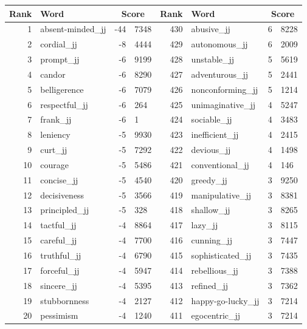 \begin{table}[tbp]
    \begin{tabular}{| rlr@{.}l | rlr@{.}l |}
    \hline
    \textbf{Rank} & \textbf{Word} & \multicolumn{2}{c|}{\textbf{Score}} & \textbf{Rank} & \textbf{Word} & \multicolumn{2}{c|}{\textbf{Score}} \\
    \hline
    1 & absent-minded\_jj & -44 & 7348    &    430 & abusive\_jj & 6 & 8228 \\
    2 & cordial\_jj & -8 & 4444    &    429 & autonomous\_jj & 6 & 2009 \\
    3 & prompt\_jj & -6 & 9199    &    428 & unstable\_jj & 5 & 5619 \\
    4 & candor & -6 & 8290    &    427 & adventurous\_jj & 5 & 2441 \\
    5 & belligerence & -6 & 7079    &    426 & nonconforming\_jj & 5 & 1214 \\
    6 & respectful\_jj & -6 & 264    &    425 & unimaginative\_jj & 4 & 5247 \\
    7 & frank\_jj & -6 & 1    &    424 & sociable\_jj & 4 & 3483 \\
    8 & leniency & -5 & 9930    &    423 & inefficient\_jj & 4 & 2415 \\
    9 & curt\_jj & -5 & 7292    &    422 & devious\_jj & 4 & 1498 \\
    10 & courage & -5 & 5486    &    421 & conventional\_jj & 4 & 146 \\
    11 & concise\_jj & -5 & 4540    &    420 & greedy\_jj & 3 & 9250 \\
    12 & decisiveness & -5 & 3566    &    419 & manipulative\_jj & 3 & 8381 \\
    13 & principled\_jj & -5 & 328    &    418 & shallow\_jj & 3 & 8265 \\
    14 & tactful\_jj & -4 & 8864    &    417 & lazy\_jj & 3 & 8115 \\
    15 & careful\_jj & -4 & 7700    &    416 & cunning\_jj & 3 & 7447 \\
    16 & truthful\_jj & -4 & 6790    &    415 & sophisticated\_jj & 3 & 7435 \\
    17 & forceful\_jj & -4 & 5947    &    414 & rebellious\_jj & 3 & 7388 \\
    18 & sincere\_jj & -4 & 5395    &    413 & refined\_jj & 3 & 7362 \\
    19 & stubbornness & -4 & 2127    &    412 & happy-go-lucky\_jj & 3 & 7214 \\
    20 & pessimism & -4 & 1240    &    411 & egocentric\_jj & 3 & 7214 \\

\end{tabular}
\end{table}
